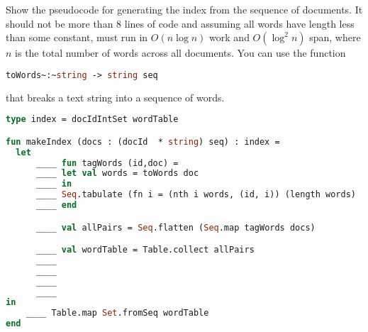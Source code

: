 \begin{problem}[8.]

\ask
Show the pseudocode for generating the index from the sequence of documents.
It should not be more than 8 lines of code and assuming all words have
length less than some constant, must run in $O(n \log n)$ work and
$O(\log^2 n)$ span, where $n$ is the total number of words across all
documents.    
%
You can use the function
%
\begin{lstlisting}[language=Caml,numbers=none]
toWords~:~string -> string seq
\end{lstlisting}
%
that breaks a text string into a sequence of words.

\solfin
\begin{lstlisting}[language=Caml, numbers=none]
type index = docIdIntSet wordTable

fun makeIndex (docs : (docId  * string) seq) : index =
  let
      ____ fun tagWords (id,doc) =                                     ____
      ____ let val words = toWords doc                                 ____
      ____ in                                                          ____
      ____ Seq.tabulate (fn i = (nth i words, (id, i)) (length words)  ____
      ____ end                                                         ____

      ____ val allPairs = Seq.flatten (Seq.map tagWords docs)          ____

      ____ val wordTable = Table.collect allPairs                      ____
      ____                                                             ____
      ____                                                             ____
      ____                                                             ____
      ____                                                             ____
in                  
    ____ Table.map Set.fromSeq wordTable                               ____
end
\end{lstlisting}
\end{problem}


